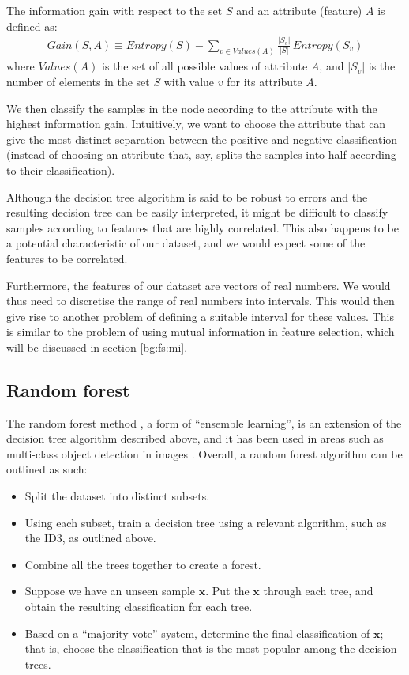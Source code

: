 \documentclass[12pt, twoside, a4paper]{report}
\begin{document}
\begin{mydef}
The information gain with respect to the set $S$ and an attribute (feature) $A$ is defined as:
\begin{align*}
Gain(S, A) \equiv Entropy(S) - \sum_{v \in Values(A)} \frac{|S_v|}{|S|} \, Entropy(S_v)
\end{align*}
where $Values(A)$ is the set of all possible values of attribute $A$, and $|S_v|$ is the number of elements in the set $S$ with value $v$ for its attribute $A$.
\end{mydef}

We then classify the samples in the node according to the attribute with the highest information gain. Intuitively, we want to choose the attribute that can give the most distinct separation between the positive and negative classification (instead of choosing an attribute that, say, splits the samples into half  according to their classification).

Although the decision tree algorithm is said to be robust to errors \cite{RefWorks:98} and the resulting decision tree can be easily interpreted, it might be difficult to classify samples according to features that are highly correlated. This also happens to be a potential characteristic of our dataset, and we would expect some of the features to be correlated.

Furthermore, the features of our dataset are vectors of real numbers. We would thus need to discretise the range of real numbers into intervals. This would then give rise to another problem of defining a suitable interval for these values. This is similar to the problem of using mutual information in feature selection, which will be discussed in section \ref{bg:fs:mi}.

\subsection{Random forest}
The random forest method \cite{RefWorks:101}, a form of ``ensemble learning'', is an extension of the decision tree algorithm described above, and it has been used in areas such as multi-class object detection in images \cite{RefWorks:100}. Overall, a random forest algorithm can be outlined as such:
\begin{itemize}
\item Split the dataset into distinct subsets.
\item Using each subset, train a decision tree using a relevant algorithm, such as the ID3, as outlined above.
\item Combine all the trees together to create a forest.
\item Suppose we have an unseen sample $\boldsymbol x$.  Put the $\boldsymbol x$ through each tree, and obtain the resulting classification for each tree.
\item Based on a ``majority vote'' system, determine the final classification of $\boldsymbol x$; that is, choose the classification that is the most popular among the decision trees.
\end{itemize}
\end{document}
